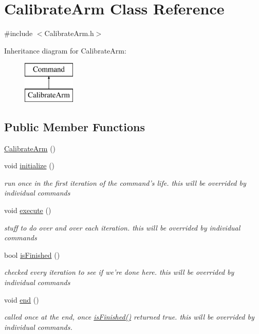\hypertarget{classCalibrateArm}{\section{Calibrate\-Arm Class Reference}
\label{classCalibrateArm}
}


{\ttfamily \#include $<$Calibrate\-Arm.\-h$>$}

Inheritance diagram for Calibrate\-Arm\-:\begin{figure}[H]
\begin{center}
\leavevmode
\includegraphics[height=2.000000cm]{classCalibrateArm}
\end{center}
\end{figure}
\subsection*{Public Member Functions}
\begin{DoxyCompactItemize}
\item 
\hyperlink{classCalibrateArm_a7acea63d8ab2c77a0e6cf52909ea52ff}{Calibrate\-Arm} ()
\item 
void \hyperlink{classCalibrateArm_acc9f34841c2ff2806338c3fe5a6d4cb6}{initialize} ()
\begin{DoxyCompactList}\small\item\em run once in the first iteration of the command's life. this will be overrided by individual commands \end{DoxyCompactList}\item 
void \hyperlink{classCalibrateArm_a931974eeaf4951b57b83219a905d89a7}{execute} ()
\begin{DoxyCompactList}\small\item\em stuff to do over and over each iteration. this will be overrided by individual commands \end{DoxyCompactList}\item 
bool \hyperlink{classCalibrateArm_a1f0193e75d78560e076166b42603bc76}{is\-Finished} ()
\begin{DoxyCompactList}\small\item\em checked every iteration to see if we're done here. this will be overrided by individual commands \end{DoxyCompactList}\item 
void \hyperlink{classCalibrateArm_a32c6c258858dde9a091e5fd0fa04c825}{end} ()
\begin{DoxyCompactList}\small\item\em called once at the end, once \hyperlink{classCalibrateArm_a1f0193e75d78560e076166b42603bc76}{is\-Finished()} returned true. this will be overrided by individual commands. \end{DoxyCompactList}\end{DoxyCompactItemize}
